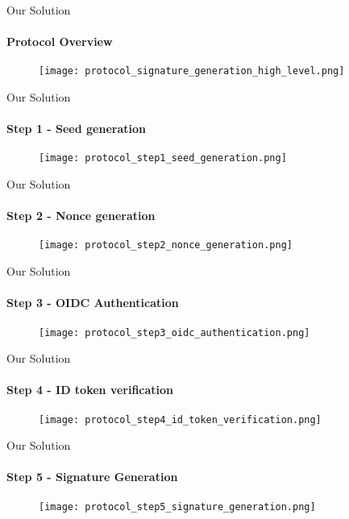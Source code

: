 \begin{frame}[t]{Our Solution}
	\framesubtitle{Protocol Overview}
	\begin{figure}[ht]
		\centering
		\texttt{[image: protocol\_signature\_generation\_high\_level.png]}
	\end{figure}
\end{frame}

\begin{frame}[t]{Our Solution}
	\framesubtitle{Step 1 - Seed generation}
	\begin{figure}[ht]
		\centering
		\texttt{[image: protocol\_step1\_seed\_generation.png]}
	\end{figure}
\end{frame}

\begin{frame}[t]{Our Solution}
	\framesubtitle{Step 2 - Nonce generation}
	\begin{figure}[ht]
		\centering
		\texttt{[image: protocol\_step2\_nonce\_generation.png]}
	\end{figure}
\end{frame}

\begin{frame}[t]{Our Solution}
	\framesubtitle{Step 3 - OIDC Authentication}
	\begin{figure}[ht]
		\centering
		\texttt{[image: protocol\_step3\_oidc\_authentication.png]}
	\end{figure}
\end{frame}

\begin{frame}[t]{Our Solution}
	\framesubtitle{Step 4 - ID token verification}
	\begin{figure}[ht]
		\centering
		\texttt{[image: protocol\_step4\_id\_token\_verification.png]}
	\end{figure}
\end{frame}

\begin{frame}[t]{Our Solution}
	\framesubtitle{Step 5 - Signature Generation}
	\begin{figure}[ht]
		\centering
		\texttt{[image: protocol\_step5\_signature\_generation.png]}
	\end{figure}
\end{frame}

